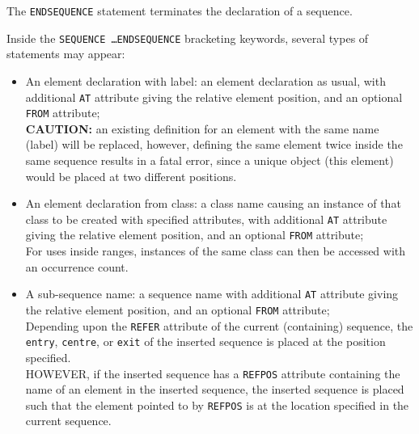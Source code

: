 The \texttt{ENDSEQUENCE} statement terminates the declaration of a
sequence. 

Inside the \texttt{SEQUENCE \ldots ENDSEQUENCE} bracketing keywords,
several types of statements may appear:
\begin{itemize}

\item An element declaration with label: 
  an element declaration as usual, with additional \texttt{AT}
  attribute giving the relative element position, and an optional
  \texttt{FROM} attribute; \\ 
  {\bf CAUTION:} an existing definition for an element with the
  same name (label) will be replaced, however, defining the same
  element twice inside the same sequence results in a fatal error,
  since a unique object (this element) would be placed at two
  different positions.

\item An element declaration from class: 
  a class name causing an instance of that class to be created with
  specified attributes, with additional \texttt{AT} attribute giving the
  relative element position, and an optional \texttt{FROM} attribute;\\
  For uses inside ranges, instances of the same class can then be
  accessed with an occurrence count.

\item A sub-sequence name:
  a sequence name with additional \texttt{AT} attribute giving the
  relative element position, and an optional \texttt{FROM} attribute;\\ 
  Depending upon the {\tt REFER} attribute of the current (containing)
  sequence, the \texttt{entry}, \texttt{centre}, or \texttt{exit} of
  the inserted sequence is placed at the position specified. \\
  HOWEVER, if the inserted sequence has a {\tt REFPOS} attribute containing
  the name of an element in the inserted sequence, the inserted sequence
  is placed such that the element pointed to by {\tt REFPOS} is at the location
  specified in the current sequence.
\end{itemize} 


